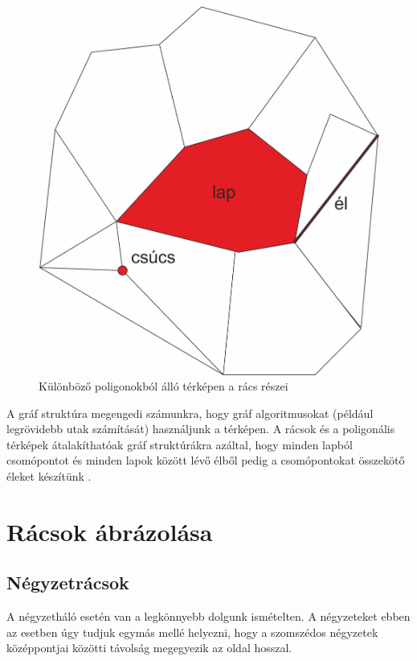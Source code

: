 \begin{figure}[h!]
\centering
\includegraphics[scale=0.4]{kepek/PartsOfGrid2.jpg}
\caption{Különböző poligonokból álló térképen a rács részei}
\label{fig:PartsOfGrid2}
\end{figure}

A gráf struktúra megengedi számunkra, hogy gráf algoritmusokat (például legrövidebb utak számítását) használjunk a térképen. A rácsok és a poligonális térképek átalakíthatóak gráf struktúrákra azáltal, hogy minden lapból csomópontot és minden lapok között lévő élből pedig a csomópontokat összekötő éleket készítünk \cite{Parts}.

\section{Rácsok ábrázolása}

\subsection{Négyzetrácsok}

A négyzetháló esetén van a legkönnyebb dolgunk ismételten. A négyzeteket ebben az esetben úgy tudjuk egymás mellé helyezni, hogy a szomszédos négyzetek középpontjai közötti távolság megegyezik az oldal hosszal. 

